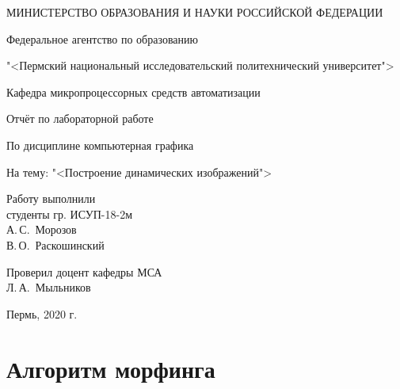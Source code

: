 \documentclass[]{article}
\author{}
\date{\vspace{-2.5em}}
\begin{document}
{
\setcounter{tocdepth}{2}
\tableofcontents
}
\begin{titlepage}
  \begin{center}
    \large
    МИНИСТЕРСТВО ОБРАЗОВАНИЯ И НАУКИ РОССИЙСКОЙ ФЕДЕРАЦИИ
    
    Федеральное агентство по образованию

    "<Пермский национальный исследовательский политехнический университет">
     
    Кафедра микропроцессорных средств автоматизации
    \vfill

    Отчёт по лабораторной работе 
    
    По дисциплине компьютерная графика
    
    На тему: "<Построение динамических изображений">
    
\end{center}
\vfill
 
\newlength{\ML}
\hfill
\begin{minipage}{0.4\textwidth}
    Работу выполнили\\
    студенты гр. ИСУП-18-2м\\
    \underline{\hspace{\ML}} А.\,С.~Морозов\\
    \underline{\hspace{\ML}} В.\,О.~Раскошинский\\
\end{minipage}%
\bigskip
 
\hfill\begin{minipage}{0.4\textwidth}
    Проверил доцент кафедры МСА\\
    \underline{\hspace{\ML}} Л.\,А.~Мыльников\\
\end{minipage}%
\vfill
 
\begin{center}
  Пермь, 2020 г.
\end{center}
\end{titlepage}

\newpage

\hypertarget{morf}{%
\section{Алгоритм морфинга}\label{morf}}
\end{document}
